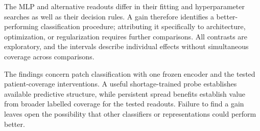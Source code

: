 \documentclass[11pt]{article}
\begin{document}
The MLP and alternative readouts differ in their fitting and hyperparameter searches as well as their decision rules. A gain therefore identifies a better-performing classification procedure; attributing it specifically to architecture, optimization, or regularization requires further comparisons. All contrasts are exploratory, and the intervals describe individual effects without simultaneous coverage across comparisons.

The findings concern patch classification with one frozen encoder and the tested patient-coverage interventions. A useful shortage-trained probe establishes available predictive structure, while persistent spread benefits establish value from broader labelled coverage for the tested readouts. Failure to find a gain leaves open the possibility that other classifiers or representations could perform better.


\end{document}
